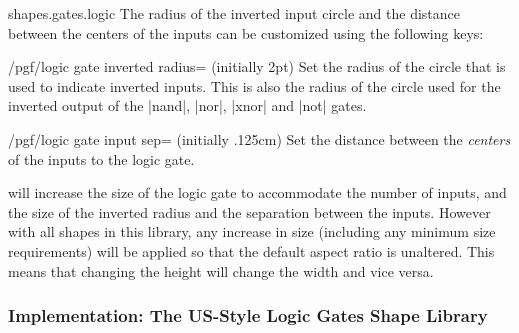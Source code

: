 \begin{pgflibrary}{shapes.gates.logic}
The radius of the inverted input circle and the distance between the
centers of the inputs can be customized using the following keys:

\begin{key}{/pgf/logic gate inverted radius= (initially 2pt)}
  Set the radius of the circle that is used to indicate inverted
  inputs. This is also the radius of the circle used for the inverted
  output of the |nand|, |nor|, |xnor| and |not| gates.

\begin{codeexample}[]
\end{codeexample}
\end{key}

\begin{key}{/pgf/logic gate input sep= (initially .125cm)}
  Set the distance between the \emph{centers} of the inputs to the
  logic gate.

\begin{codeexample}[]
\end{codeexample}
\end{key}

  \pgfname{} will increase the size of the
  logic gate to accommodate the number of inputs, and the size
  of the inverted radius and the separation between the inputs.
  However with all shapes in this library, any increase in size
  (including any minimum size requirements) will be applied so that
  the default aspect ratio is unaltered. This means that changing
  the height will change the width and vice versa.

\end{pgflibrary}


\subsubsection{Implementation: The US-Style Logic Gates Shape Library}

